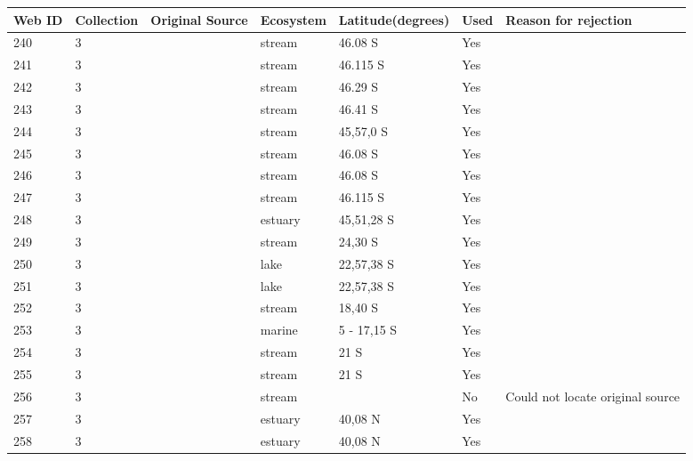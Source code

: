 \documentclass[12pt]{article}
\begin{document}
\begin{landscape}
    \begin{table}[h!]
    \centering
    {\footnotesize
      \begin{tabular}{p{2.8cm}p{1.3cm}p{5.5cm}p{2.2cm}p{2.5cm}lp{3.5cm}}
        \hline
        Web ID & Collection & Original Source & Ecosystem & Latitude(degrees) & Used  & Reason for rejection  \\
        \hline
        240   & 3 & \cite{Thompson2004c}  & stream & 46.08 S & Yes   &       \\
        241   & 3 & \cite{Thompson2004c}  & stream & 46.115 S & Yes   &       \\
        242   & 3 & \cite{Thompson2004c}  & stream & 46.29 S & Yes   &       \\
        243   & 3 & \cite{Thompson2004c}  & stream & 46.41 S & Yes   &       \\
        244   & 3 & \cite{Thompson2004c}  & stream & 45,57,0 S & Yes   &       \\
        245   & 3 & \cite{Thompson2004c}  & stream & 46.08 S & Yes   &       \\
        246   & 3 & \cite{Thompson2004c}  & stream & 46.08 S & Yes   &       \\
        247   & 3 & \cite{Thompson2004c}  & stream & 46.115 S & Yes   &       \\
        248   & 3 & \cite{Thompson2004}  & estuary & 45,51,28 S & Yes   &        \\
        249   & 3 & \cite{Angelini2005}  & stream & 24,30 S & Yes   &       \\
        250   & 3 & \cite{Angelini2006}  & lake  & 22,57,38 S & Yes   &       \\
        251   & 3 & \cite{Angelini2006}  & lake  & 22,57,38 S & Yes   &       \\
        252   & 3 & \cite{Angelini2010}  & stream & 18,40 S & Yes   &       \\
        253   & 3 & \cite{Angelini2011}  & marine & 5 - 17,15 S & Yes   &       \\
        254   & 3 & \cite{Angelini2013}  & stream & 21 S  & Yes   &       \\
        255   & 3 & \cite{Angelini2013}  & stream & 21 S  & Yes   &       \\
        256   & 3 & \cite{Angelini2013}  & stream &       & No    & Could not locate original source \\
        257   & 3 & \cite{Baeta2011}  & estuary & 40,08 N & Yes   &       \\
        258   & 3 & \cite{Baeta2011}  & estuary & 40,08 N & Yes   &       \\

\end{tabular}}
\end{table}
\end{landscape}
\end{document}
